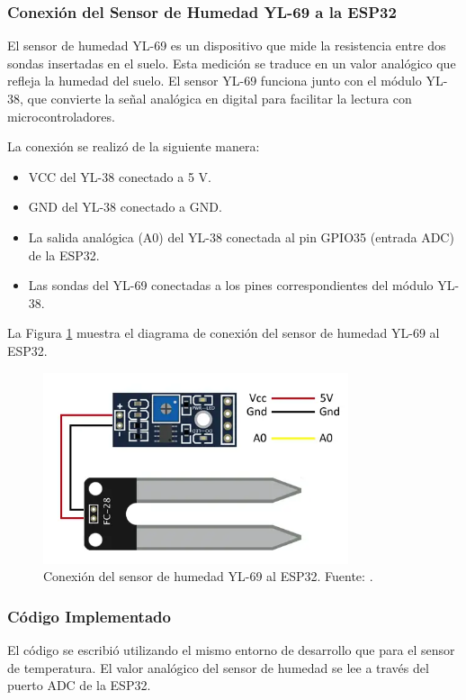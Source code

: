 \subsubsection{Conexión del Sensor de Humedad YL-69 a la ESP32}
El sensor de humedad YL-69 es un dispositivo que mide la resistencia entre dos sondas insertadas en el suelo. Esta medición se traduce en un valor analógico que refleja la humedad del suelo. El sensor YL-69 funciona junto con el módulo YL-38, que convierte la señal analógica en digital para facilitar la lectura con microcontroladores.

La conexión se realizó de la siguiente manera:

\begin{itemize}
    \item VCC del YL-38 conectado a 5 V.
    \item GND del YL-38 conectado a GND.
    \item La salida analógica (A0) del YL-38 conectada al pin GPIO35 (entrada ADC) de la ESP32.
    \item Las sondas del YL-69 conectadas a los pines correspondientes del módulo YL-38.
\end{itemize}

La Figura \ref{fig:conexion_yl69} muestra el diagrama de conexión del sensor de humedad YL-69 al ESP32.

\begin{figure}[h]
    \centering
    \includegraphics[width=0.8\textwidth]{./Figures/Pruebas/conexion_yl69.png}
    \caption{Conexión del sensor de humedad YL-69 al ESP32. Fuente: \citep{higrometroFC-28}.}
    \label{fig:conexion_yl69}
\end{figure}

\subsubsection{Código Implementado}
El código se escribió utilizando el mismo entorno de desarrollo que para el sensor de temperatura. El valor analógico del sensor de humedad se lee a través del puerto ADC de la ESP32.

